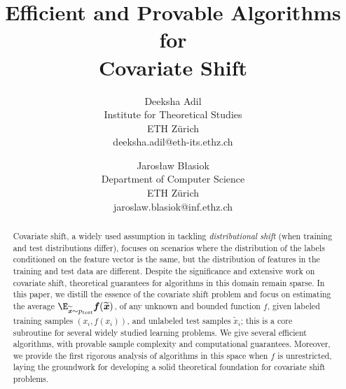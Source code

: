 \documentclass{article}
\title{Efficient and Provable Algorithms for \\ Covariate Shift}
\author{Deeksha Adil\\Institute for Theoretical Studies\\ETH Zürich \\ deeksha.adil@eth-its.ethz.ch\and  Jarosław Błasiok\\Department of Computer Science\\ ETH Zürich\\jaroslaw.blasiok@inf.ethz.ch
}
\newcommand{\ff}{\boldsymbol{\mathit{f}}}
\newcommand{\xx}{\boldsymbol{\mathit{x}}}
\begin{document}
\maketitle

\begin{abstract}
Covariate shift, a widely used assumption in tackling {\it distributional shift} (when training and test distributions differ), focuses on scenarios where the distribution of the labels conditioned on the feature vector is the same, but the distribution of features in the training and test data are different. Despite the significance and extensive work on covariate shift, theoretical guarantees for algorithms in this domain remain sparse. In this paper, we distill the essence of the covariate shift problem and focus on estimating the average $\E_{\widetilde{\xx}\sim p_{\mathrm{test}}}\ff(\widetilde{\xx})$, of any unknown and bounded function $\ff$,   given labeled training samples $(\xx_i, \ff(\xx_i))$, and unlabeled test samples $\widetilde{\xx}_i$; this is a core subroutine for several widely studied learning problems. We give several efficient algorithms, with provable sample complexity and computational guarantees. Moreover, we provide the first rigorous analysis of algorithms in this space when $\ff$ is unrestricted, laying the groundwork for developing a solid theoretical foundation for covariate shift problems.
\end{abstract}








\printbibliography

\newpage

\appendix





\end{document}
